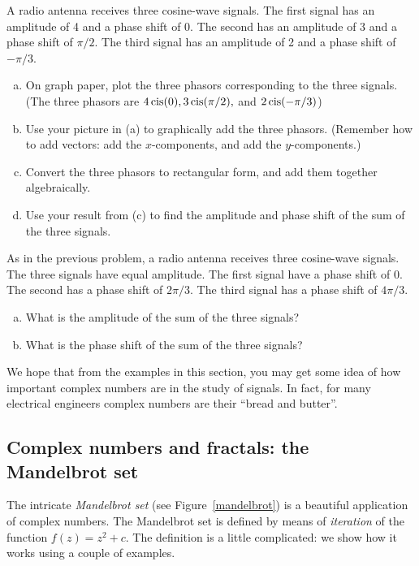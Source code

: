 \begin{exercise}{46}
A radio antenna receives three cosine-wave signals. The first signal has an amplitude of 4 and a phase shift of 0. The second has an amplitude of 3 and a phase shift of $\pi/2$. The third signal has an amplitude of 2 and a phase shift of $-\pi/3$.
\begin{enumerate}[(a)]
\item
On graph paper,  plot the three phasors corresponding to the three signals. (The three phasors are $4 \operatorname{cis}(0), 3 \operatorname{cis}(\pi/2),$ and $2 \operatorname{cis}(-\pi/3)$)
\item
Use your picture in (a) to graphically add the three phasors. (Remember how to add vectors:  add the $x$-components, and add the $y$-components.)
\item
Convert the three phasors to rectangular form, and add them together algebraically.
\item
Use your result from (c) to find the amplitude and phase shift of the sum of the three signals.
\end{enumerate}
\end{exercise}


\begin{exercise}{47}
As in the previous problem, a radio antenna receives three cosine-wave signals. The three signals have equal amplitude. The first signal have a phase shift of 0. The second has a phase shift of $2\pi/3$. The third signal has  a phase shift of $4\pi/3$.
\begin{enumerate}[(a)]
\item
 What is the amplitude of the sum of the three signals?
\item
What is the phase shift of the sum of the three signals?
\end{enumerate}
\end{exercise}

We hope that from the examples in this section, you may get some idea of how important complex numbers are in the study of signals. In fact, for many electrical engineers complex numbers are their ``bread and butter''. 


\subsection{Complex numbers and fractals: the Mandelbrot set} \label{sec:mandelbrot}
The intricate \emph{Mandelbrot set} (see Figure~\ref{mandelbrot}) is a beautiful application of complex numbers.
The Mandelbrot set is defined by means of \emph{iteration} of the function $f(z) = z^2 + c$. The definition is a little complicated: we show how it works using a couple of examples.


